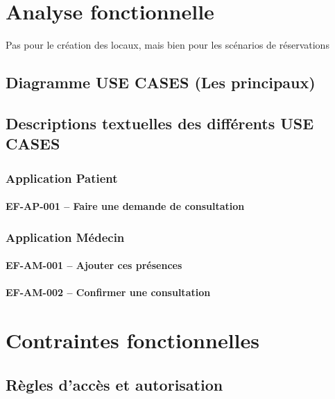\documentclass[a4paper,11pt]{article}
\begin{document}
	\newpage
	
	\section{Analyse fonctionnelle}
	
	Pas pour le création des locaux, mais bien pour les scénarios de réservations 
		
	\subsection{Diagramme USE CASES (Les principaux)}

	\subsection{Descriptions textuelles des différents USE CASES}

	\subsubsection{Application Patient}

	\paragraph{EF-AP-001 -- Faire une demande de consultation}

	\subsubsection{Application Médecin}
	
	\paragraph{EF-AM-001 -- Ajouter ces présences}

	\paragraph{EF-AM-002 -- Confirmer une consultation}
	
	\newpage
	
	\section{Contraintes fonctionnelles}
	
	\subsection{Règles d'accès et autorisation}
	
\end{document}
